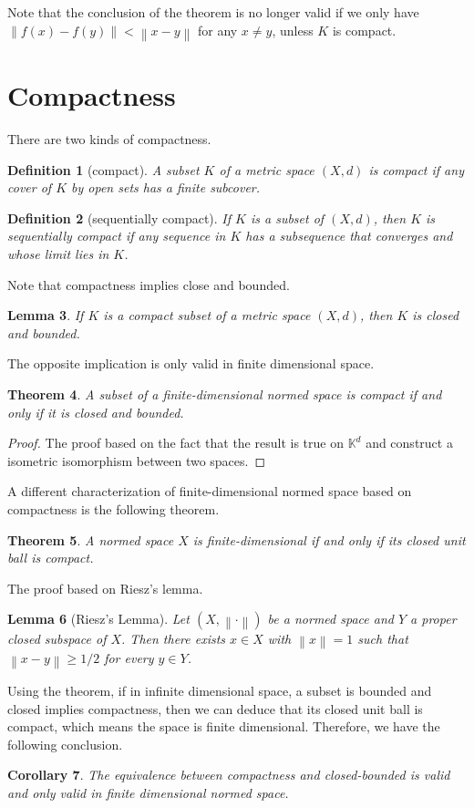 \documentclass[12pt,a4paper]{report}
\numberwithin{equation}{section}
\theoremstyle{mystyle}
\newtheorem{definition}{Definition}[section]
\newtheorem{theorem}[definition]{Theorem}
\newtheorem{lemma}[definition]{Lemma}
\newtheorem{corollary}[definition]{Corollary}
\newcommand{\K}{\mathbb{K}}
\newcommand{\norm}[1]{\left\lVert #1 \right\rVert}
\begin{document}
	
	Note that the conclusion of the theorem is no longer valid if we only have $\norm{f(x)-f(y)}<\norm{x-y}$ for any $x\neq y$, unless $K$ is compact.
	
	\section{Compactness}
	There are two kinds of compactness. 
	\begin{definition}[compact]
		A subset $K$ of a metric space $(X,d)$ is \emph{compact} if any cover of $K$ by open sets has a finite subcover.
	\end{definition}
	\begin{definition}[sequentially compact]
		If $K$ is a subset of $(X,d)$, then $K$ is \emph{sequentially compact} if any sequence in $K$ has a subsequence that converges and whose limit lies in $K$.
	\end{definition}
	
	Note that compactness implies close and bounded. 
	\begin{lemma}
		If $K$ is a compact subset of a metric space $(X,d)$, then $K$ is closed and bounded.
	\end{lemma}
	The opposite implication is only valid in finite dimensional space.
	\begin{theorem}
		A subset of a finite-dimensional normed space is compact if and only if it is closed and bounded.
	\end{theorem}
	\begin{proof}
		The proof based on the fact that the result is true on $\K^d$ and construct a isometric isomorphism between two spaces.
	\end{proof}
	A different characterization of finite-dimensional normed space based on compactness is the following theorem.
	\begin{theorem}
		A normed space $X$ is finite-dimensional if and only if its closed unit ball is compact.
	\end{theorem}
	The proof based on Riesz's lemma.
	\begin{lemma}[Riesz's Lemma]
		Let $(X,\norm{\cdot})$ be a normed space and $Y$ a proper closed subspace of $X$. Then there exists $x\in X$ with $\norm{x}=1$ such that $\norm{x-y}\geq 1/2$ for every $y\in Y$.
	\end{lemma}

	Using the theorem, if in infinite dimensional space, a subset is bounded and closed implies compactness, then we can deduce that its closed unit ball is compact, which means the space is finite dimensional. Therefore, we have the following conclusion.
	\begin{corollary}
		The equivalence between compactness and closed-bounded is valid and only valid in finite dimensional normed space.
	\end{corollary}
	
\end{document}
